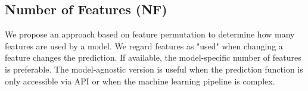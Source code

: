 \documentclass[runningheads]{llncs}\usepackage[]{graphicx}\usepackage[]{color}
\begin{document}
%





\subsection{Number of Features (NF)}
\label{sec:nfeatures}

We propose an approach based on feature permutation to determine how many features are used by a model.
We regard features as "used" when changing a feature changes the prediction.
If available, the model-specific number of features is preferable.
The model-agnostic version is useful when the prediction function is only accessible via API or when the machine learning pipeline is complex.
\end{document}
